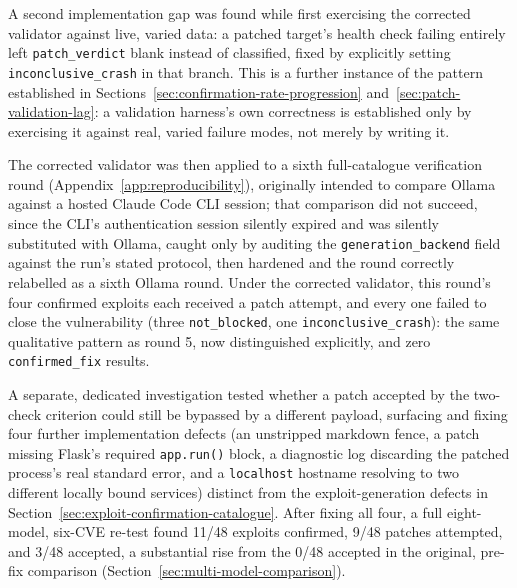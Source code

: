 \documentclass[12pt,a4paper]{report}
\begin{document}
A second implementation gap was found while first exercising the corrected validator against live, varied data: a patched target's health check failing entirely left \texttt{patch\_verdict} blank instead of classified, fixed by explicitly setting \texttt{inconclusive\_crash} in that branch. This is a further instance of the pattern established in Sections~\ref{sec:confirmation-rate-progression} and~\ref{sec:patch-validation-lag}: a validation harness's own correctness is established only by exercising it against real, varied failure modes, not merely by writing it.

The corrected validator was then applied to a sixth full-catalogue verification round (Appendix~\ref{app:reproducibility}), originally intended to compare Ollama against a hosted Claude Code CLI session; that comparison did not succeed, since the CLI's authentication session silently expired and was silently substituted with Ollama, caught only by auditing the \texttt{generation\_backend} field against the run's stated protocol, then hardened and the round correctly relabelled as a sixth Ollama round. Under the corrected validator, this round's four confirmed exploits each received a patch attempt, and every one failed to close the vulnerability (three \texttt{not\_blocked}, one \texttt{inconclusive\_crash}): the same qualitative pattern as round 5, now distinguished explicitly, and zero \texttt{confirmed\_fix} results.

A separate, dedicated investigation tested whether a patch accepted by the two-check criterion could still be bypassed by a different payload, surfacing and fixing four further implementation defects (an unstripped markdown fence, a patch missing Flask's required \texttt{app.run()} block, a diagnostic log discarding the patched process's real standard error, and a \texttt{localhost} hostname resolving to two different locally bound services) distinct from the exploit-generation defects in Section~\ref{sec:exploit-confirmation-catalogue}. After fixing all four, a full eight-model, six-CVE re-test found 11/48 exploits confirmed, 9/48 patches attempted, and 3/48 accepted, a substantial rise from the 0/48 accepted in the original, pre-fix comparison (Section~\ref{sec:multi-model-comparison}).
\end{document}
